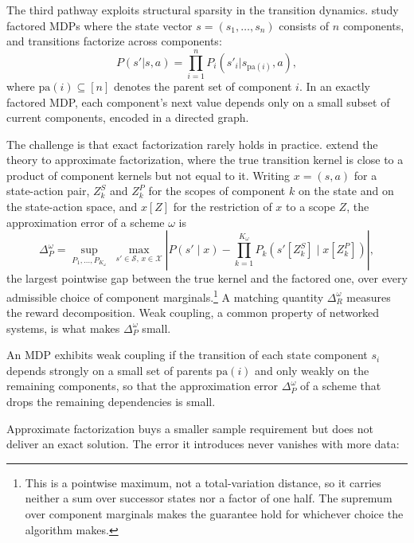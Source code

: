 The third pathway exploits structural sparsity in the transition dynamics. \citet{lu2025} study factored MDPs where the state vector $s = (s_1, \ldots, s_n)$ consists of $n$ components, and transitions factorize across components:
\begin{equation}
P(s'|s, a) = \prod_{i=1}^{n} P_i(s'_i | s_{\text{pa}(i)}, a),
\end{equation}
where $\text{pa}(i) \subseteq [n]$ denotes the parent set of component $i$. In an exactly factored MDP, each component's next value depends only on a small subset of current components, encoded in a directed graph.

The challenge is that exact factorization rarely holds in practice. \citeauthor{lu2025} extend the theory to approximate factorization, where the true transition kernel is close to a product of component kernels but not equal to it. Writing $x = (s,a)$ for a state-action pair, $Z^S_k$ and $Z^P_k$ for the scopes of component $k$ on the state and on the state-action space, and $x[Z]$ for the restriction of $x$ to a scope $Z$, the approximation error of a scheme $\omega$ is
\begin{equation}
\Delta_P^\omega = \sup_{P_1, \ldots, P_{K_\omega}} \; \max_{s' \in \mathcal{S},\, x \in \mathcal{X}} \left| P(s' \mid x) - \prod_{k=1}^{K_\omega} P_k\!\left( s'[Z^S_k] \mid x[Z^P_k] \right) \right|,
\label{eq:lu_coupling}
\end{equation}
the largest pointwise gap between the true kernel and the factored one, over every admissible choice of component marginals.\footnote{This is a pointwise maximum, not a total-variation distance, so it carries neither a sum over successor states nor a factor of one half. The supremum over component marginals makes the guarantee hold for whichever choice the algorithm makes.} A matching quantity $\Delta_R^\omega$ measures the reward decomposition. Weak coupling, a common property of networked systems, is what makes $\Delta_P^\omega$ small.

\begin{definition}
\label{def:weak_coupling}
An MDP exhibits weak coupling if the transition of each state component $s_i$ depends strongly on a small set of parents $\text{pa}(i)$ and only weakly on the remaining components, so that the approximation error $\Delta_P^\omega$ of a scheme that drops the remaining dependencies is small.
\end{definition}

Approximate factorization buys a smaller sample requirement but does not deliver an exact solution. The error it introduces never vanishes with more data:

